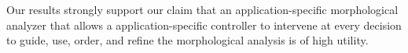 \documentclass[11pt]{article}
\begin{document}
%
%
Our results strongly support our claim that
an application-specific morphological analyzer that allows a application-specific 
controller to intervene at every decision to guide, use, order, and 
refine the morphological analysis is of high utility.
\end{document}
